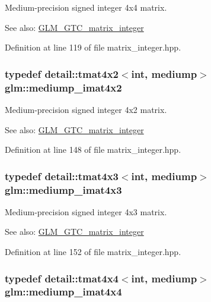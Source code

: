 Medium-precision signed integer 4x4 matrix. \begin{Desc}
\item[See also:]\hyperlink{group__gtc__matrix__integer}{GLM\_\-GTC\_\-matrix\_\-integer} \end{Desc}


Definition at line 119 of file matrix\_\-integer.hpp.\hypertarget{group__gtc__matrix__integer_gcdae7d6ae4820756c62c2b5fd5c0370a}{
\subsubsection[mediump\_\-imat4x2]{\setlength{\rightskip}{0pt plus 5cm}typedef detail::tmat4x2$<$int, mediump$>$ {\bf glm::mediump\_\-imat4x2}}}
\label{group__gtc__matrix__integer_gcdae7d6ae4820756c62c2b5fd5c0370a}


Medium-precision signed integer 4x2 matrix. \begin{Desc}
\item[See also:]\hyperlink{group__gtc__matrix__integer}{GLM\_\-GTC\_\-matrix\_\-integer} \end{Desc}


Definition at line 148 of file matrix\_\-integer.hpp.\hypertarget{group__gtc__matrix__integer_g5032ee978a55aa0db4842d5c3cbeade0}{
\subsubsection[mediump\_\-imat4x3]{\setlength{\rightskip}{0pt plus 5cm}typedef detail::tmat4x3$<$int, mediump$>$ {\bf glm::mediump\_\-imat4x3}}}
\label{group__gtc__matrix__integer_g5032ee978a55aa0db4842d5c3cbeade0}


Medium-precision signed integer 4x3 matrix. \begin{Desc}
\item[See also:]\hyperlink{group__gtc__matrix__integer}{GLM\_\-GTC\_\-matrix\_\-integer} \end{Desc}


Definition at line 152 of file matrix\_\-integer.hpp.\hypertarget{group__gtc__matrix__integer_gfa2df6be3aad055867b9bfea34e9c4a0}{
\subsubsection[mediump\_\-imat4x4]{\setlength{\rightskip}{0pt plus 5cm}typedef detail::tmat4x4$<$int, mediump$>$ {\bf glm::mediump\_\-imat4x4}}}
\label{group__gtc__matrix__integer_gfa2df6be3aad055867b9bfea34e9c4a0}


